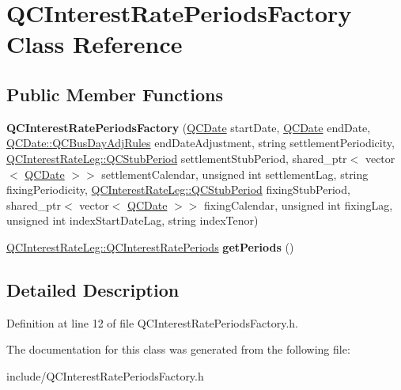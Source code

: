 \hypertarget{class_q_c_interest_rate_periods_factory}{\section{Q\+C\+Interest\+Rate\+Periods\+Factory Class Reference}
\label{class_q_c_interest_rate_periods_factory}
}
\subsection*{Public Member Functions}
\begin{DoxyCompactItemize}
\item 
\hypertarget{class_q_c_interest_rate_periods_factory_a5421afc68914df1c7aa9310c79466336}{{\bfseries Q\+C\+Interest\+Rate\+Periods\+Factory} (\hyperlink{class_q_c_date}{Q\+C\+Date} start\+Date, \hyperlink{class_q_c_date}{Q\+C\+Date} end\+Date, \hyperlink{class_q_c_date_a17e5b6c9a1a784f917c8e84045d7e362}{Q\+C\+Date\+::\+Q\+C\+Bus\+Day\+Adj\+Rules} end\+Date\+Adjustment, string settlement\+Periodicity, \hyperlink{class_q_c_interest_rate_leg_a70e636ef79eb9bc4c6b84ea526e56521}{Q\+C\+Interest\+Rate\+Leg\+::\+Q\+C\+Stub\+Period} settlement\+Stub\+Period, shared\+\_\+ptr$<$ vector$<$ \hyperlink{class_q_c_date}{Q\+C\+Date} $>$$>$ settlement\+Calendar, unsigned int settlement\+Lag, string fixing\+Periodicity, \hyperlink{class_q_c_interest_rate_leg_a70e636ef79eb9bc4c6b84ea526e56521}{Q\+C\+Interest\+Rate\+Leg\+::\+Q\+C\+Stub\+Period} fixing\+Stub\+Period, shared\+\_\+ptr$<$ vector$<$ \hyperlink{class_q_c_date}{Q\+C\+Date} $>$$>$ fixing\+Calendar, unsigned int fixing\+Lag, unsigned int index\+Start\+Date\+Lag, string index\+Tenor)}\label{class_q_c_interest_rate_periods_factory_a5421afc68914df1c7aa9310c79466336}

\item 
\hypertarget{class_q_c_interest_rate_periods_factory_a95073c612b862bbd84e00048f93338a7}{\hyperlink{class_q_c_interest_rate_leg_ad04f1da06a7b5d44fea906bd8c62de28}{Q\+C\+Interest\+Rate\+Leg\+::\+Q\+C\+Interest\+Rate\+Periods} {\bfseries get\+Periods} ()}\label{class_q_c_interest_rate_periods_factory_a95073c612b862bbd84e00048f93338a7}

\end{DoxyCompactItemize}


\subsection{Detailed Description}


Definition at line 12 of file Q\+C\+Interest\+Rate\+Periods\+Factory.\+h.



The documentation for this class was generated from the following file\+:\begin{DoxyCompactItemize}
\item 
include/Q\+C\+Interest\+Rate\+Periods\+Factory.\+h\end{DoxyCompactItemize}
